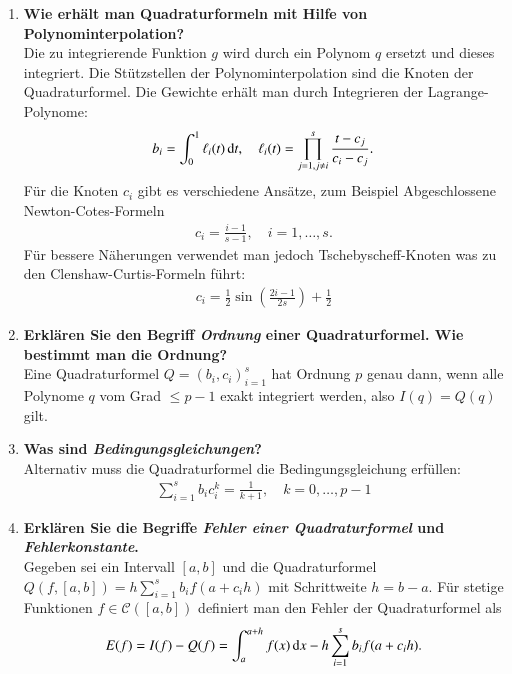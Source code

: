 \begin{enumerate}
		\item \textbf{Wie erhält man Quadraturformeln mit Hilfe von Polynominterpolation?} \\
			Die zu integrierende Funktion \(g\) wird durch ein Polynom \(q\) ersetzt und dieses integriert. Die Stützstellen der Polynominterpolation sind die Knoten der Quadraturformel. Die Gewichte erhält man durch Integrieren der Lagrange-Polynome:
			\begin{align*}
				b_i=\int_{0}^{1}\ell_i(t)\dif{t},\quad \ell_i(t)=\prod_{j=1,j\neq i}^{s}\frac{t-c_j}{c_i-c_j}.
			\end{align*}
			Für die Knoten \(c_i\) gibt es verschiedene Ansätze, zum Beispiel Abgeschlossene Newton-Cotes-Formeln
			\begin{align*}
				c_i=\frac{i-1}{s-1}, \quad i=1,\dots,s.
			\end{align*}
			Für bessere Näherungen verwendet man jedoch Tschebyscheff-Knoten was zu den Clenshaw-Curtis-Formeln führt:
			\begin{align*}
				c_i=\frac{1}{2}\sin\left(\frac{2i-1}{2s}\right)+\frac{1}{2}
			\end{align*}
			
		\item \textbf{Erklären Sie den Begriff \textit{Ordnung} einer Quadraturformel. Wie bestimmt man die Ordnung?} \\
			Eine Quadraturformel \(Q=(b_i,c_i)^s_{i=1}\) hat Ordnung \(p\) genau dann, wenn alle Polynome \(q\) vom Grad \(\leq p-1\) exakt integriert werden, also \(I(q)=Q(q)\) gilt. \\
			
		
		\item \textbf{Was sind \textit{Bedingungsgleichungen}?} \\
			Alternativ muss die Quadraturformel die Bedingungsgleichung erfüllen:
				\begin{align*}
					\sum_{i=1}^{s}b_ic_i^k=\frac{1}{k+1},\quad
						k=0,\dots,p-1
				\end{align*}
		
		\item \textbf{Erklären Sie die Begriffe \textit{Fehler einer Quadraturformel} und \textit{Fehlerkonstante}.} \\
		Gegeben sei ein Intervall \([a,b]\) und die Quadraturformel \(Q(f,[a,b])=h\sum_{i=1}^{s}b_if(a+c_ih)\) mit Schrittweite \(h=b-a\). Für stetige Funktionen \(f\in\mathscr{C}([a,b])\) definiert man den Fehler der Quadraturformel als
		\begin{align*}
			E(f)=I(f)-Q(f)=\int_{a}^{a+h}f(x)\dif{x}-h\sum_{i=1}^{s}b_if(a+c_ih).
		\end{align*}
		

\end{enumerate}
